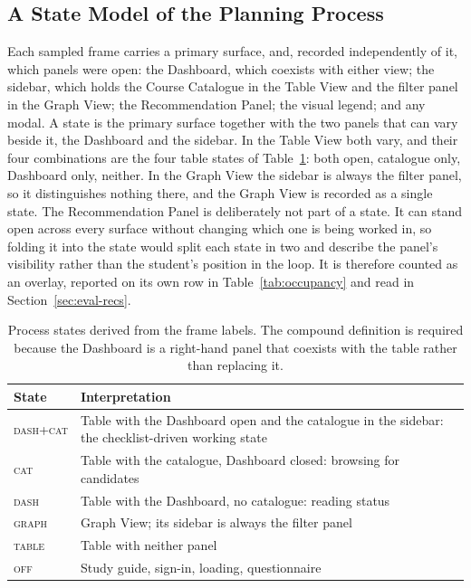 \subsection{A State Model of the Planning Process}
\label{sec:eval-statemodel}
Each sampled frame carries a primary surface, and, recorded independently of it, which
panels were open: the Dashboard, which coexists with either view; the sidebar, which holds the Course Catalogue in the Table View and the filter panel
in the Graph View; the Recommendation Panel; the visual
legend; and any modal. A state is the primary surface together with the two panels that can vary beside it, the Dashboard and the sidebar. In the Table View both vary, and their four combinations are the four table states of Table~\ref{tab:states}: both open, catalogue only, Dashboard only, neither. In the Graph View the sidebar is always the filter panel, so it distinguishes nothing there, and the Graph View is recorded as a single state. The Recommendation Panel is deliberately not part of a state. It can stand
open across every surface without changing which one is being worked in, so folding it into
the state would split each state in two and describe the panel's visibility rather than the
student's position in the loop. It is therefore counted as an overlay, reported on its own
row in Table~\ref{tab:occupancy} and read in Section~\ref{sec:eval-recs}.

\begin{table}[htpb]
    \centering
    \small
    \begin{tabular}{lp{7.4cm}}
        \toprule
        State & Interpretation \\
        \midrule
        \textsc{dash+cat} & Table with the Dashboard open and the catalogue in the sidebar: the checklist-driven working state \\
        \textsc{cat}      & Table with the catalogue, Dashboard closed: browsing for candidates \\
        \textsc{dash}     & Table with the Dashboard, no catalogue: reading status \\
        \textsc{graph}    & Graph View; its sidebar is always the filter panel \\
        \textsc{table}    & Table with neither panel \\
        \textsc{off}      & Study guide, sign-in, loading, questionnaire \\
        \bottomrule
    \end{tabular}
    \caption{Process states derived from the frame labels. The compound definition is required because the Dashboard is a right-hand panel that coexists with the table rather than replacing it.}
    \label{tab:states}
\end{table}


